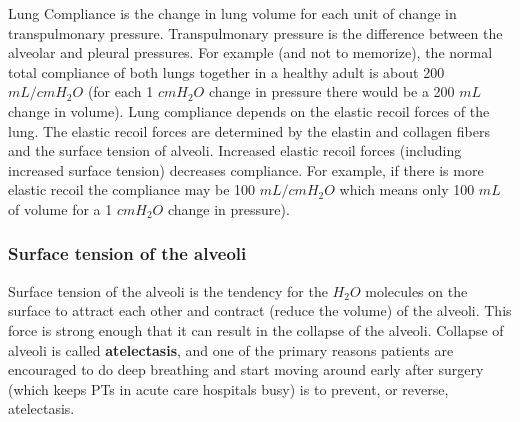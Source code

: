 Lung Compliance is the change in lung volume for each unit of change in transpulmonary pressure. Transpulmonary pressure is the difference between the alveolar and pleural pressures. For example (and not to memorize), the normal total compliance of both lungs together in a healthy adult is about 200 $mL/cm H_2O$ (for each 1  $cm H_2O$ change in pressure there would be a 200 $mL$ change in volume). 
Lung compliance depends on the elastic recoil forces of the lung. The elastic recoil forces are determined by the elastin and collagen fibers and the surface tension of alveoli. Increased elastic recoil forces (including increased surface tension) decreases compliance. For example, if there is more elastic recoil the compliance may be 100 $mL/cm H_2O$ which means only 100 $mL$ of volume for a 1 $cm H_2O$ change in pressure).

\subsubsection{Surface tension of the alveoli} 
Surface tension of the alveoli is the tendency for the $H_2O$ molecules on the surface to attract each other and contract (reduce the volume) of the alveoli. This force is strong enough that it can result in the collapse of the alveoli. Collapse of alveoli is called \textbf{atelectasis}, and one of the primary reasons patients are encouraged to do deep breathing and start moving around early after surgery (which keeps PTs in acute care  hospitals busy) is to prevent, or reverse, atelectasis.

